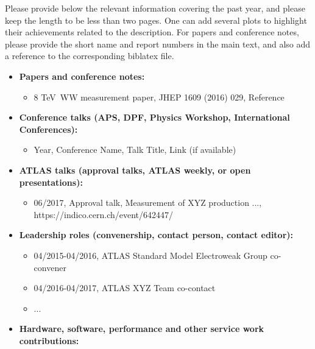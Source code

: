 Please provide below the relevant information covering the past year, and please keep the length to be less than two pages. One can add several plots to highlight their achievements related to the description. For papers and conference notes, please provide the short name and report numbers in the main text, and also add a reference to the corresponding biblatex file.

\begin{itemize}

\item \textbf{Papers and conference notes:}

    \begin{itemize}
        \item 8 TeV~WW measurement paper,  JHEP 1609 (2016) 029, Reference~\cite{Aad:2016wpd}
    \end{itemize}


\item \textbf{Conference talks (APS, DPF, Physics Workshop, International Conferences):}

    \begin{itemize}
        \item Year, Conference Name, Talk Title, Link (if available)
    \end{itemize}


\item \textbf{ATLAS talks (approval talks, ATLAS weekly, or open presentations):}

    \begin{itemize}
        \item 06/2017, Approval talk, Measurement of XYZ production ..., https://indico.cern.ch/event/642447/
    \end{itemize}

\item \textbf{Leadership roles (convenership, contact person, contact editor):}

    \begin{itemize}
        \item 04/2015-04/2016, ATLAS Standard Model Electroweak Group co-convener
        \item 04/2016-04/2017, ATLAS XYZ Team co-contact
        \item ...
    \end{itemize}

\item \textbf{Hardware, software, performance and other service work contributions:}    


\end{itemize}
